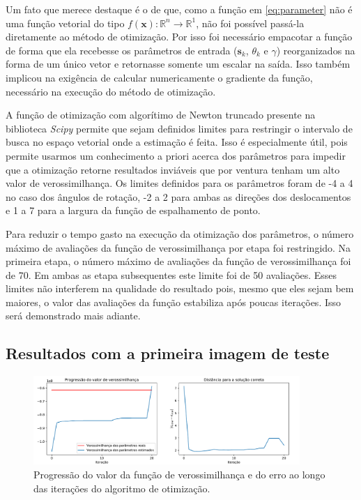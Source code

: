 Um fato que merece destaque é o de que, como a função em \ref{eq:parameter} não é uma
função vetorial do tipo $ f(\mathbf{x}) : \mathbb{R}^n \to \mathbb{R}^1 $, não foi 
possível passá-la diretamente ao método de otimização.
Por isso foi necessário empacotar a função de forma que ela recebesse os parâmetros de
entrada ($\mathbf{s}_k$, $\theta_k$ e $\gamma$) reorganizados na forma de um único
vetor e retornasse somente um escalar na saída.
Isso também implicou na exigência de calcular numericamente o gradiente da função,
necessário na execução do método de otimização.

A função de otimização com algorítimo de Newton truncado presente na biblioteca
\emph{Scipy} permite que sejam definidos limites para restringir o intervalo de busca
no espaço vetorial onde a estimação é feita.
Isso é especialmente útil, pois permite usarmos um conhecimento a priori acerca dos
parâmetros para impedir que a otimização retorne resultados inviáveis que por ventura
tenham um alto valor de verossimilhança.
Os limites definidos para os parâmetros foram de -4 a 4 no caso dos ângulos de rotação,
-2 a 2 para ambas as direções dos deslocamentos e 1 a 7 para a largura da função de
espalhamento de ponto.

Para reduzir o tempo gasto na execução da otimização dos parâmetros, o número máximo de avaliações da função de verossimilhança por etapa foi restringido.
Na primeira etapa, o número máximo de avaliações da função de verossimilhança foi de 70.
Em ambas as etapa subsequentes este limite foi de 50 avaliações.
Esses limites não interferem na qualidade do resultado pois, mesmo que eles sejam bem maiores, o valor das avaliações da função estabiliza após poucas iterações.
Isso será demonstrado mais adiante.

\subsection{Resultados com a primeira imagem de teste}

\begin{figure}[h]
	\centering
	\caption{\label{fig:progression} Progressão do valor da função de verossimilhança e do erro ao longo das iterações do algoritmo de otimização.}
	\includegraphics[width=0.90\textwidth]{./figures/results_figures/progression_plot.pdf}
\end{figure}

